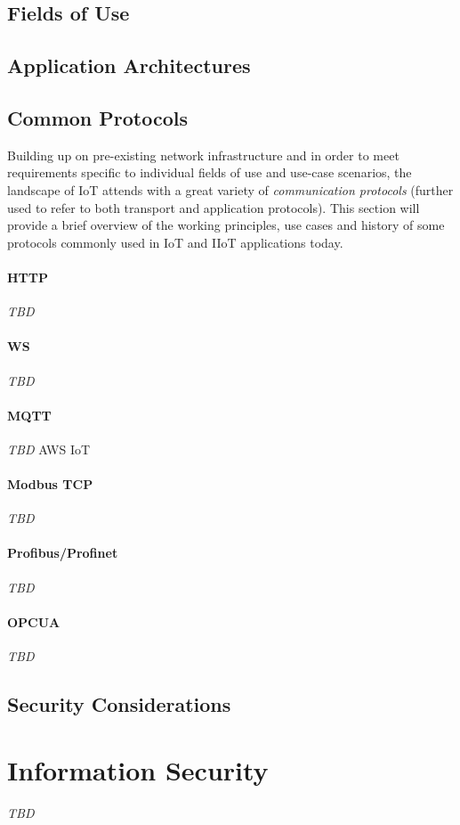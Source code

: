 \subsection{Fields of Use}
\subsection{Application Architectures}
\subsection{Common Protocols}
\label{sec:iot-common-protocols}
Building up on pre-existing network infrastructure and in order to meet requirements specific to individual fields of use and use-case scenarios, the landscape of \ac{IoT} attends with a great variety of \emph{communication protocols} (further used to refer to both transport and application protocols). This section will provide a brief overview of the working principles, use cases and history of some protocols commonly used in \ac{IoT} and \ac{IIoT} applications today.
\paragraph{\ac{HTTP}} \emph{TBD} %
\paragraph{\ac{WS}} \emph{TBD} %
\paragraph{\ac{MQTT}} \emph{TBD} \ac{AWS} \ac{IoT}%
\paragraph{Modbus \ac{TCP}} \emph{TBD} %
\paragraph{Profibus/Profinet} \emph{TBD} %
\paragraph{\ac{OPCUA}} \emph{TBD} %

\subsection{Security Considerations}

\section{Information Security}
\label{sec:information-security}
\emph{TBD} %
